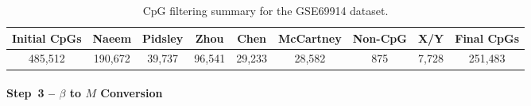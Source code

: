 \documentclass[10pt]{extarticle}
\begin{document}
\begin{table}[t]
\centering
\caption{CpG filtering summary for the GSE69914 dataset.}
\label{tab:gse69914_cpg_filtering}
\begin{tabular}{c c c c c c c c c}
\hline
Initial CpGs &
Naeem &
Pidsley &
Zhou &
Chen &
McCartney &
Non-CpG &
X/Y &
Final CpGs \\
\hline
485{,}512 &
190{,}672 &
39{,}737 &
96{,}541 &
29{,}233 &
28{,}582 &
875 &
7{,}728 &
251{,}483 \\
\hline
\end{tabular}
\end{table}



\paragraph{Step~3 -- $\beta$ to $M$ Conversion}
\label{par:gse69914_step4}
\end{document}
